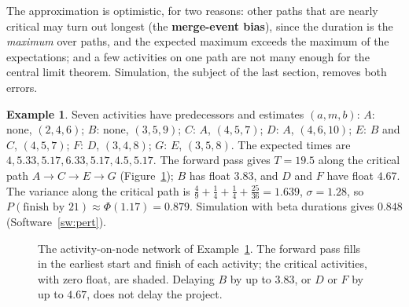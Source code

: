 \documentclass[11pt,a4paper]{article}
\numberwithin{equation}{section}
\theoremstyle{definition}
\newtheorem{exa}[thm]{Example}
\begin{document}
The approximation is optimistic, for two reasons: other paths that are nearly critical may turn out longest (the \textbf{merge-event bias}), since the duration is the \emph{maximum} over paths, and the expected maximum exceeds the maximum of the expectations; and a few activities on one path are not many enough for the central limit
theorem. Simulation, the subject of the last section, removes both errors.

\begin{exa}
\label{ex:pert}
Seven activities have predecessors and estimates $(a, m, b)$: $A$: none, $(2, 4, 6)$; $B$: none, $(3, 5, 9)$; $C$: $A$, $(4, 5, 7)$; $D$: $A$, $(4, 6, 10)$; $E$: $B$ and $C$, $(4, 5, 7)$; $F$: $D$, $(3, 4, 8)$; $G$: $E$, $(3, 5, 8)$. The expected times are $4, 5.33, 5.17, 6.33, 5.17, 4.5, 5.17$. The forward pass gives
$T = 19.5$ along the critical path $A \to C \to E \to G$ (Figure~\ref{fig:cpm}); $B$ has float $3.83$, and $D$ and $F$ have float $4.67$. The variance along the critical path is $\frac49 + \frac14 + \frac14 + \frac{25}{36} = 1.639$, $\sigma = 1.28$, so $P(\text{finish by } 21) \approx \Phi(1.17) = 0.879$. Simulation
with beta durations gives $0.848$ (Software~\ref{sw:pert}).
\end{exa}

\begin{figure}[H]
\centering
{}
\caption{The activity-on-node network of Example~\ref{ex:pert}. The forward pass fills in the earliest start and finish of each activity; the critical activities, with zero float, are shaded. Delaying $B$ by up to $3.83$, or $D$ or $F$ by up to $4.67$, does not delay the project.}
\label{fig:cpm}
\end{figure}
\end{document}
